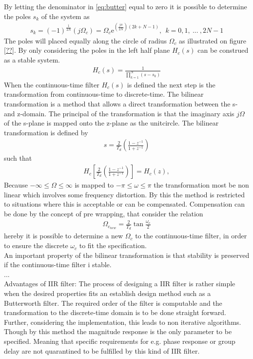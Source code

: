 By letting the denominator in \eqref{eq:butter} equal to zero it is possible to determine the poles $s_k$ of the system as 
\begin{align}
s_k = (-1)^{\frac{1}{2N}}\left(j\Omega_c\right)=\Omega_c\text{e}^{\left(\frac{j\pi}{2N}\right)\left(2k+N-1\right)}, \ \ k=0,1,\ ... \ , 2N-1 
\end{align}   
The poles will placed equally along the circle of radius $\Omega_c$ as illustrated on figure \ref{??}. By only considering the poles in the left half plane $H_c(s)$ can be construed as a stable system. 
\begin{align}
H_c(s)=\frac{1}{\prod_{k=1}^{N}(s-s_k)}
\end{align}    
When the continuous-time filter $H_c(s)$ is defined the next step is the transformation from continuous-time to discrete-time. The bilinear transformation is a method that allows a direct transformation between the s- and z-domain. The principal of the transformation is that the imaginary axis $j\Omega$ of the s-plane is mapped onto the z-plane as the unitcircle. The bilinear transformation is defined by 
\begin{align}
s=\frac{2}{T_d}\left(\frac{1-z^{-1}}{1+z^{-1}}\right) 
\end{align}
such that 
\begin{align}
H_c\left[\frac{2}{T_d}\left(\frac{1-z^{-1}}{1+z^{-1}}\right)\right]=H_c(z), 
\end{align}  
Because $-\infty \leq \Omega \leq \infty $ is mapped to $-\pi \leq \omega \leq \pi$ the transformation most be non linear which involves some frequency distortion. By this the method is restricted to situations where this is acceptable or can be compensated. Compensation can be done by the concept of pre wrapping, that consider the relation 
\begin{align}
\Omega_{c_{new}}=\frac{2}{T_d}\tan\frac{\omega_c}{2}
\end{align}
hereby it is possible to determine a new $\Omega_c$ to the continuous-time filter, in order to ensure the discrete $\omega_c$ to fit the specification.\\
An important property of the bilinear transformation is that stability is preserved if the continuous-time filter i stable. \\
... \\
Advantages of IIR filter:
The process of designing a IIR filter is rather simple when the desired properties fits an establish design method such as a Butterworth filter. The required order of the filter is computable and the transformation to the discrete-time domain is to be done straight forward. Further, considering the implementation, this leads to non iterative algorithms. \\
Though by this method the magnitude response is the only parameter to be specified. Meaning that specific requirements for e.g. phase response or group delay are not quarantined to be fulfilled by this kind of IIR filter.

